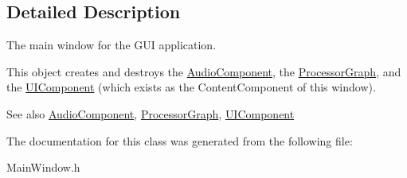 \subsection{Detailed Description}
The main window for the G\-U\-I application.

This object creates and destroys the \hyperlink{classAudioComponent}{Audio\-Component}, the \hyperlink{classProcessorGraph}{Processor\-Graph}, and the \hyperlink{classUIComponent}{U\-I\-Component} (which exists as the Content\-Component of this window).

\begin{DoxySeeAlso}{See also}
\hyperlink{classAudioComponent}{Audio\-Component}, \hyperlink{classProcessorGraph}{Processor\-Graph}, \hyperlink{classUIComponent}{U\-I\-Component} 
\end{DoxySeeAlso}


The documentation for this class was generated from the following file\-:\begin{DoxyCompactItemize}
\item 
Main\-Window.\-h\end{DoxyCompactItemize}
